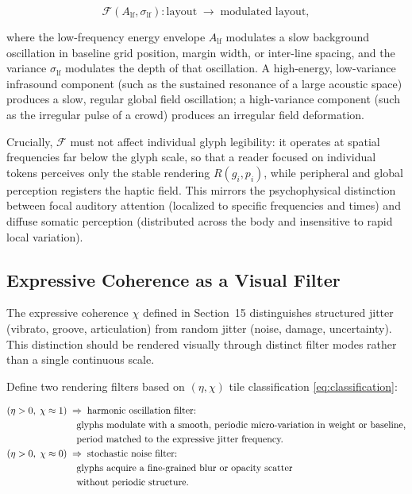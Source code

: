 \documentclass[12pt, a4paper]{article}
\begin{document}
\begin{equation}
\mathcal{F}(A_{\mathrm{lf}}, \sigma_{\mathrm{lf}}) : \text{layout} \;\to\; \text{modulated layout},
\label{eq:fieldmod}
\end{equation}

where the low-frequency energy envelope $A_{\mathrm{lf}}$ modulates a slow background oscillation in baseline grid position, margin width, or inter-line spacing, and the variance $\sigma_{\mathrm{lf}}$ modulates the depth of that oscillation. A high-energy, low-variance infrasound component (such as the sustained resonance of a large acoustic space) produces a slow, regular global field oscillation; a high-variance component (such as the irregular pulse of a crowd) produces an irregular field deformation.

Crucially, $\mathcal{F}$ must not affect individual glyph legibility: it operates at spatial frequencies far below the glyph scale, so that a reader focused on individual tokens perceives only the stable rendering $R(g_i, p_i)$, while peripheral and global perception registers the haptic field. This mirrors the psychophysical distinction between focal auditory attention (localized to specific frequencies and times) and diffuse somatic perception (distributed across the body and insensitive to rapid local variation).

\subsection{Expressive Coherence as a Visual Filter}

The expressive coherence $\chi$ defined in Section~15 distinguishes structured jitter (vibrato, groove, articulation) from random jitter (noise, damage, uncertainty). This distinction should be rendered visually through distinct filter modes rather than a single continuous scale.

Define two rendering filters based on $(\eta, \chi)$ tile classification \eqref{eq:classification}:

\begin{align}
(\eta > 0,\; \chi \approx 1) &\;\Rightarrow\; \text{harmonic oscillation filter:} \notag\\
&\quad\text{glyphs modulate with a smooth, periodic micro-variation in weight or baseline,} \notag\\
&\quad\text{period matched to the expressive jitter frequency.} \label{eq:expfilter}\\
(\eta > 0,\; \chi \approx 0) &\;\Rightarrow\; \text{stochastic noise filter:} \notag\\
&\quad\text{glyphs acquire a fine-grained blur or opacity scatter} \notag\\
&\quad\text{without periodic structure.} \notag
\end{align}
\end{document}
